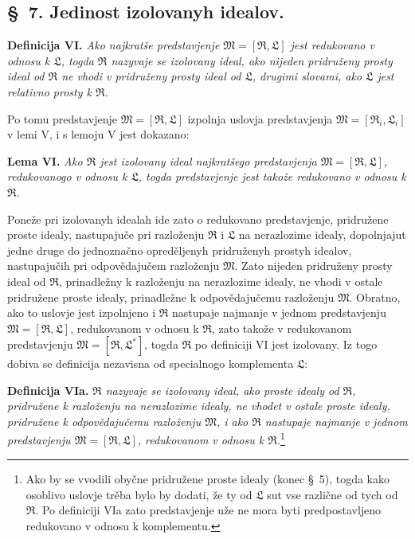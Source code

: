 \documentclass[11pt]{article}
\newcommand{\ideal}[1]{\mathfrak{#1}}
\begin{document}

\setcounter{footnote}{28}
\subsection*{\S~7. Jedinost izolovanyh idealov.}

\textbf{Definicija VI.} \emph{Ako najkratše predstavjenje \(\ideal M=[\ideal R,\ideal L]\) jest redukovano v odnosu k \(\ideal L\), togda \(\ideal R\) nazyvaje se izolovany ideal, ako nijeden pridruženy prosty ideal od \(\ideal R\) ne vhodi v pridruženy prosty ideal od \(\ideal L\), drugimi slovami, ako \(\ideal L\) jest relativno prosty k \(\ideal R\).}

Po tomu predstavjenje \(\ideal M=[\ideal R,\ideal L]\) izpolnja uslovja predstavjenja \(\ideal M=[\ideal R_i,\ideal L_i]\) v lemi V, i s lemoju V jest dokazano:

\textbf{Lema VI.} \emph{Ako \(\ideal R\) jest izolovany ideal najkratšego predstavjenja \(\ideal M=[\ideal R,\ideal L]\), redukovanogo v odnosu k \(\ideal L\), togda predstavjenje jest takože redukovano v odnosu k \(\ideal R\).}

Poneže pri izolovanyh idealah ide zato o redukovano predstavjenje, pridružene proste idealy, nastupajuče pri razloženju \(\ideal R\) i \(\ideal L\) na nerazlozime idealy, dopolnjajut jedne druge do jednoznačno opreděljenyh pridruženyh prostyh idealov, nastupajučih pri odpovědajučem razloženju \(\ideal M\). Zato nijeden pridruženy prosty ideal od \(\ideal R\), prinadležny k razloženju na nerazlozime idealy, ne vhodi v ostale pridružene proste idealy, prinadležne k odpovědajučemu razloženju \(\ideal M\). Obratno, ako to uslovje jest izpolnjeno i \(\ideal R\) nastupaje najmanje v jednom predstavjenju \(\ideal M=[\ideal R,\ideal L]\), redukovanom v odnosu k \(\ideal R\), zato takože v redukovanom predstavjenju \(\ideal M=[\ideal R,\ideal L^*]\), togda \(\ideal R\) po definiciji VI jest izolovany. Iz togo dobiva se definicija nezavisna od specialnogo komplementa \(\ideal L\):

\textbf{Definicija VIa.} \emph{\(\ideal R\) nazyvaje se izolovany ideal, ako proste idealy od \(\ideal R\), pridružene k razloženju na nerazlozime idealy, ne vhodet v ostale proste idealy, pridružene k odpovědajučemu razloženju \(\ideal M\), i ako \(\ideal R\) nastupaje najmanje v jednom predstavjenju \(\ideal M=[\ideal R,\ideal L]\), redukovanom v odnosu k \(\ideal R\).}\footnote{Ako by se vvodili obyčne pridružene proste idealy (konec \S~5), togda kako osoblivo uslovje trěba bylo by dodati, že ty od \(\ideal L\) sut vse različne od tych od \(\ideal R\). Po definiciji VIa zato predstavjenje uže ne mora byti predpostavljeno redukovano v odnosu k komplementu.}
\end{document}
